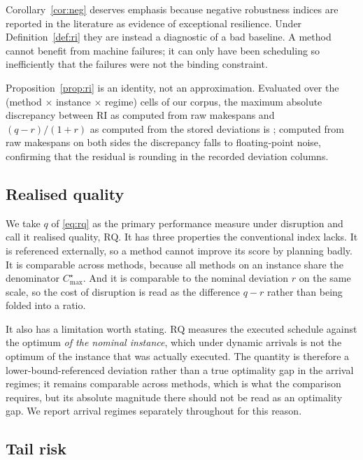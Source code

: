 \documentclass[a4paper,fleqn]{cas-sc}
\newcommand{\Cmax}{C_{\max}}
\newcommand{\RI}{\mathrm{RI}}
\newcommand{\RQ}{\mathrm{RQ}}
\begin{document}
Corollary~\ref{cor:neg} deserves emphasis because negative robustness indices
are reported in the literature as evidence of exceptional resilience. Under
Definition~\ref{def:ri} they are instead a diagnostic of a bad baseline. A
method cannot benefit from machine failures; it can only have been scheduling so
inefficiently that the failures were not the binding constraint.

Proposition~\ref{prop:ri} is an identity, not an approximation. Evaluated over
the \PropCells{} (method $\times$ instance $\times$ regime) cells of our corpus,
the maximum absolute discrepancy between $\RI$ as computed from raw makespans
and $(q-r)/(1+r)$ as computed from the stored deviations is \PropErr{}; computed
from raw makespans on both sides the discrepancy falls to floating-point noise,
confirming that the residual is rounding in the recorded deviation columns.

\subsection{Realised quality}

We take $q$ of \eqref{eq:rq} as the primary performance measure under
disruption and call it realised quality, $\RQ$. It has three properties the
conventional index lacks. It is referenced externally, so a method cannot
improve its score by planning badly. It is comparable across methods, because
all methods on an instance share the denominator $\Cmax^{\star}$. And it is
comparable to the nominal deviation $r$ on the same scale, so the cost of
disruption is read as the difference $q-r$ rather than being folded into a
ratio.

It also has a limitation worth stating. $\RQ$ measures the executed schedule
against the optimum \emph{of the nominal instance}, which under dynamic arrivals
is not the optimum of the instance that was actually executed. The quantity is
therefore a lower-bound-referenced deviation rather than a true optimality gap
in the arrival regimes; it remains comparable across methods, which is what the
comparison requires, but its absolute magnitude there should not be read as an
optimality gap. We report arrival regimes separately throughout for this reason.

\subsection{Tail risk}
\end{document}
